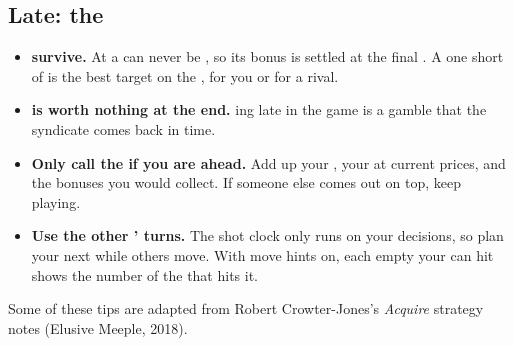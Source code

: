 \subsection{Late: the }
\begin{itemize}
  \item \textbf{  survive.} At   a  can never be , so its  bonus is
    settled at the final . A  one  short of  is the best target on the , for you or for a rival.
  \item \textbf{  is worth nothing at the end.} ing late in the game is a gamble that the syndicate
    comes back in time.
  \item \textbf{Only call the  if you are ahead.} Add up your , your  at current prices, and the bonuses
    you would collect. If someone else comes out on top, keep playing.
  \item \textbf{Use the other ' turns.} The shot clock only runs on your decisions, so plan your next  while others
    move. With move hints on, each empty  your  can hit shows the number of the  that hits it.
\end{itemize}

{\small\color{spike} Some of these tips are adapted from Robert Crowter-Jones's \emph{Acquire} strategy notes (Elusive Meeple, 2018).\par}
